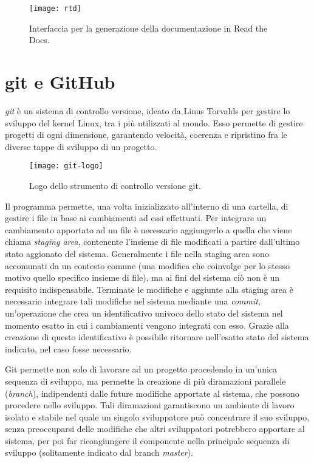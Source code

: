 \begin{figure}[h]
	\center
	\texttt{[image: rtd]}
	\caption[Schermata di build di Read the Docs.]{Interfaccia per la generazione della documentazione in Read the Docs.}
	\label{fig:rtd-build}
\end{figure}

\section{git e GitHub}
\nocite{git}
\emph{git} è un sistema di controllo versione, ideato da Linus Torvalds per
gestire lo sviluppo del kernel Linux, tra i più utilizzati al mondo.
Esso permette di gestire progetti di ogni dimensione, garantendo velocità,
coerenza e ripristino fra le diverse tappe di sviluppo di un progetto.

\begin{wrapfigure} {O} {0.35\textwidth}
	\begin{centering}	
		\texttt{[image: git-logo]}
		\caption[Logo git]{Logo dello strumento di controllo versione git.}
	\end{centering}
\end{wrapfigure}

Il programma permette, una volta inizializzato all'interno di una cartella,
di gestire i file in base ai cambiamenti ad essi effettuati. Per integrare
un cambiamento apportato ad un file è necessario aggiungerlo a quella
che viene chiama \emph{staging area}, contenente l'insieme
di file modificati a partire dall'ultimo stato aggionato del sistema.
Generalmente i file nella staging area sono accomunati da un contesto
comune (una modifica che coinvolge per lo stesso motivo quello specifico
insieme di file), ma ai fini del sistema ciò non è un requisito indispensabile.
Terminate le modifiche e aggiunte alla staging area è necessario integrare
tali modifiche nel sistema mediante una \emph{commit}, un'operazione
che crea un identificativo univoco dello stato del sistema nel momento esatto
in cui i cambiamenti vengono integrati con esso. Grazie alla creazione
di questo identificativo è possibile ritornare nell'esatto stato
del sistema indicato, nel caso fosse necessario.

Git permette non solo di lavorare ad un progetto procedendo in un'unica
sequenza di sviluppo, ma permette la creazione di più diramazioni parallele
(\emph{branch}), indipendenti dalle future modifiche apportate al sistema,
che possono procedere nello sviluppo. Tali diramazioni garantiscono un
ambiente di lavoro isolato e stabile nel quale un singolo sviluppatore può
concentrare il suo sviluppo, senza preoccuparsi delle modifiche che altri
sviluppatori potrebbero apportare al sistema, per poi far ricongiungere
il componente nella principale sequenza di sviluppo (solitamente indicato
dal branch \emph{master}).

